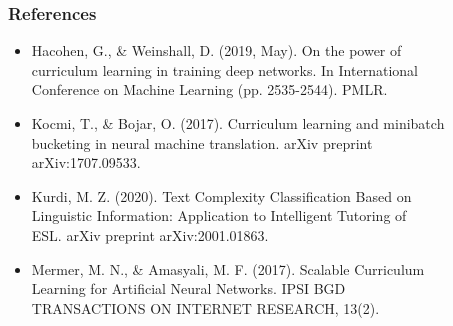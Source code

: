 \documentclass{beamer}
\begin{document}
\begin{frame}
	\frametitle{References}
	\begin{itemize}
		\item Hacohen, G., \& Weinshall, D. (2019, May). On the power of \\\hspace{1cm}curriculum learning in training
		deep networks. In International\\\hspace{1cm}Conference on Machine Learning (pp. 2535-2544).
		PMLR.
		\item Kocmi, T., \& Bojar, O. (2017). Curriculum learning and minibatch \\\hspace{1cm}bucketing in neural
		machine translation. arXiv preprint \\\hspace{1cm}arXiv:1707.09533.
		\item Kurdi, M. Z. (2020). Text Complexity Classification Based on \\\hspace{1cm}Linguistic Information:
		Application to Intelligent Tutoring of \\\hspace{1cm}ESL. arXiv preprint arXiv:2001.01863.
		\item Mermer, M. N., \& Amasyali, M. F. (2017). Scalable Curriculum \\\hspace{1cm}Learning for Artificial
		Neural Networks. IPSI BGD \\\hspace{1cm}TRANSACTIONS ON INTERNET RESEARCH, 13(2).
	\end{itemize}
\end{frame}
\end{document}
